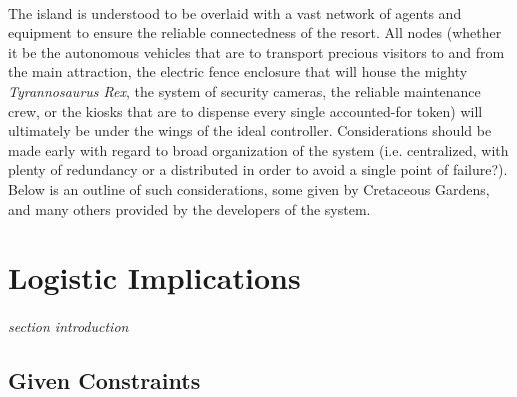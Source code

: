 \documentclass[12pt]{article}
\begin{document}
\paragraph{} The island is understood to be overlaid with a vast network of agents and equipment to
ensure the reliable connectedness of the resort. All nodes (whether it be the autonomous vehicles that are
to transport precious visitors to and from the main attraction, the electric fence enclosure that will 
house the mighty \textit{Tyrannosaurus Rex}, the system of security cameras, the reliable maintenance crew, 
or the kiosks that are to dispense every single accounted-for token) will ultimately be under the wings
of the ideal controller. Considerations should be made early with regard to broad organization of the system
(i.e. centralized, with plenty of redundancy or a distributed in order to avoid a single point of failure?).
Below is an outline of such considerations, some given by Cretaceous Gardens, and many others provided by
the developers of the system.


\section{Logistic Implications}
\paragraph{} \textit{section introduction}

	\subsection{Given Constraints}
\end{document}
